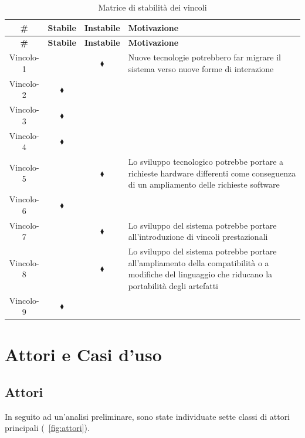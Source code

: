 \begin{longtable}{|c|c|c|p{7cm}|}
\caption{Matrice di stabilità dei vincoli}\label{tab:stabilita-vincoli}\\
\hline\hline
\rowcolor{grigio-chiarissimo} \textbf{\#} & \textbf{Stabile} & \textbf{Instabile} & \textbf{Motivazione} \\
\hline\hline
\endfirsthead
\hline\hline
\rowcolor{grigio-chiarissimo} \textbf{\#} & \textbf{Stabile} & \textbf{Instabile} & \textbf{Motivazione} \\
\hline\hline
\endhead

Vincolo-1 &  & $\blacklozenge$ & Nuove tecnologie potrebbero far migrare il sistema verso nuove forme di interazione \\ 
\hline 
Vincolo-2 & $\blacklozenge$ &  &  \\ 
\hline 
Vincolo-3 & $\blacklozenge$ & & \\ 
\hline 
Vincolo-4 & $\blacklozenge$ & & \\ 
\hline 
Vincolo-5 &  & $\blacklozenge$ & Lo sviluppo tecnologico potrebbe portare a richieste hardware differenti come conseguenza di un ampliamento delle richieste software \\ 
\hline 
Vincolo-6 & $\blacklozenge$ & & \\ 
\hline 
Vincolo-7 & & $\blacklozenge$ & Lo sviluppo del sistema potrebbe portare all'introduzione di vincoli prestazionali \\ 
\hline 
Vincolo-8 & & $\blacklozenge$ & Lo sviluppo del sistema potrebbe portare all'ampliamento della compatibilità o a modifiche del linguaggio che riducano la portabilità degli artefatti\\ 
\hline 
Vincolo-9 & $\blacklozenge$ & & \\ 
\hline

\end{longtable}


\section{Attori e Casi d'uso}

\subsection{Attori}

In seguito ad un'analisi preliminare, sono state individuate sette classi di attori principali (\figurename~\ref{fig:attori}).

